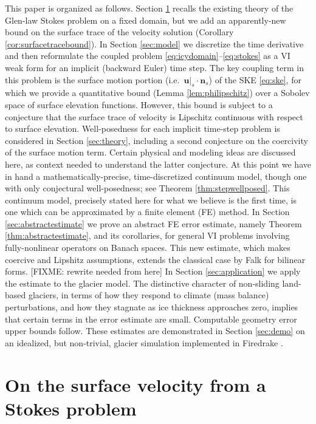\documentclass[hidelinks,onefignum,onetabnum,final]{siamart220329}  %
\newcommand{\bn}{\mathbf{n}}
\newcommand{\bu}{\mathbf{u}}
\begin{document}
This paper is organized as follows.  Section \ref{sec:stokes} recalls the existing theory of the Glen-law Stokes problem on a fixed domain, but we add an apparently-new bound on the surface trace of the velocity solution (Corollary \ref{cor:surfacetracebound}).  In Section \ref{sec:model} we discretize the time derivative and then reformulate the coupled problem \eqref{eq:icydomain}--\eqref{eq:stokes} as a VI weak form for an implicit (backward Euler) time step.  The key coupling term in this problem is the surface motion portion (i.e.~$\bu|_s\cdot \bn_s$) of the SKE \eqref{eq:ske}, for which we provide a quantitative bound (Lemma \ref{lem:philipschitz}) over a Sobolev space of surface elevation functions.  However, this bound is subject to a conjecture that the surface trace of velocity is Lipschitz continuous with respect to surface elevation.  Well-posedness for each implicit time-step problem is considered in Section \ref{sec:theory}, including a second conjecture on the coercivity of the surface motion term.  Certain physical and modeling ideas are discussed here, as context needed to understand the latter conjecture.  At this point we have in hand a mathematically-precise, time-discretized continuum model, though one with only conjectural well-posedness; see Theorem \ref{thm:stepwellposed}.  This continuum model, precisely stated here for what we believe is the first time, is one which can be approximated by a finite element (FE) method.  In Section \ref{sec:abstractestimate} we prove an abstract FE error estimate, namely Theorem \ref{thm:abstractestimate}, and its corollaries, for general VI problems involving fully-nonlinear operators on Banach spaces.  This new estimate, which makes coercive and Lipshitz assumptions, extends the classical case by Falk \cite{Falk1974} for bilinear forms.  [FIXME: rewrite needed from here] In Section \ref{sec:application} we apply the estimate to the glacier model.  The distinctive character of non-sliding land-based glaciers, in terms of how they respond to climate (mass balance) perturbations, and how they stagnate as ice thickness approaches zero, implies that certain terms in the error estimate are small.  Computable geometry error upper bounds follow.  These estimates are demonstrated in Section \ref{sec:demo} on an idealized, but non-trivial, glacier simulation implemented in Firedrake \cite{Hametal2023}.


\section{On the surface velocity from a Stokes problem} \label{sec:stokes}
\end{document}
